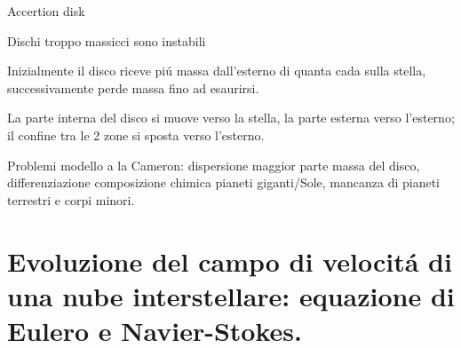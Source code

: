 \begin{wordonframe}{Accertion disk}

Dischi troppo massicci sono instabili

Inizialmente il disco riceve pi\'u massa dall'esterno di quanta cada sulla stella, successivamente perde massa fino ad esaurirsi.

La parte interna del disco si muove verso la stella, la parte esterna verso l'esterno; il confine tra le 2 zone si sposta verso l'esterno.

Problemi modello a la Cameron: dispersione maggior parte massa del disco, differenziazione composizione chimica pianeti giganti/Sole, mancanza di pianeti terrestri e corpi minori.

\end{wordonframe}

\section{Evoluzione del campo di velocit\'a di una nube interstellare: equazione di Eulero e Navier-Stokes.}

